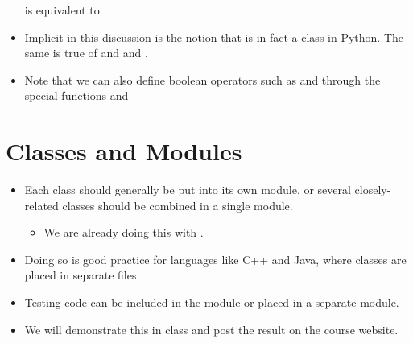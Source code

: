 \documentclass[letterpaper,10pt,english]{sphinxmanual}
\begin{document}
\begin{itemize}
is equivalent to

%
\begin{sphinxVerbatim}[commandchars=\\\{\}]
\end{sphinxVerbatim}

\item {} 
Implicit in this discussion is the notion that  is in fact a
class in Python.  The same is true of  and  and
.

\item {} 
Note that we can also define boolean operators such as \sphinxcode{\sphinxupquote{==}} and \sphinxcode{\sphinxupquote{!=}}
through the special functions  and 

\end{itemize}


\section{Classes and Modules}
\label{\detokenize{lecture_notes/lec18_classes1:classes-and-modules}}\begin{itemize}
\item {} 
Each class should generally be put into its own module, or several
closely-related classes should be combined in a single module.
\begin{itemize}
\item {} 
We are already doing this with .

\end{itemize}

\item {} 
Doing so is good practice for languages like C++ and Java, where
classes are placed in separate files.

\item {} 
Testing code can be included in the module or placed in a separate
module.

\item {} 
We will demonstrate this in class and post the result on the course
website.

\end{itemize}
\end{document}
